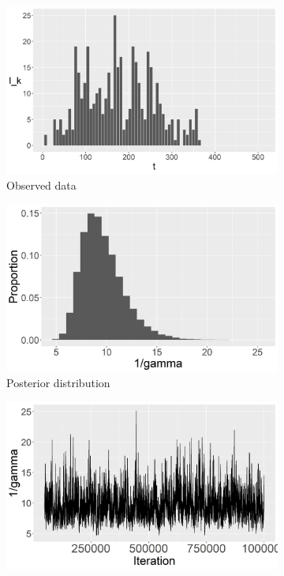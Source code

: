 \documentclass{beamer}
\begin{document}
\begin{frame}
	\begin{figure}
		\centering
		\begin{subfigure}[b]{0.32\textwidth}
			\centering
			\includegraphics[width=\textwidth]{observed_data}
			\caption{Observed data}
		\end{subfigure}
		\hfill
		\begin{subfigure}[b]{0.32\textwidth}
			\centering
			\includegraphics[width=\textwidth]{E5_expected_infection_length_hist}
			\caption{Posterior distribution}
		\end{subfigure}
		\hfill
		\begin{subfigure}[b]{0.32\textwidth}
			\centering
			\includegraphics[width=\textwidth]{E5_expected_infection_length_tp}

\end{subfigure}
\end{figure}
\end{frame}
\end{document}
